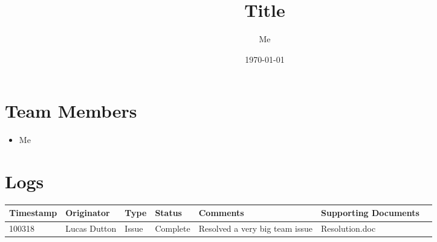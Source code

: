 \documentclass[12pt]{article}
\title{Title}
\author{Me}
\date{\today}
\begin{document}
\maketitle
\section{Team Members}
\begin{itemize}
\item Me
\end{itemize}
\newpage
\section{Logs}
\begin{table}[h]
\begin{tabularx}{\textwidth}{|X|X|X|X|X|X|X|}
\hline
Timestamp & Originator & Type & Status & Comments & Supporting Documents\\
\hline
100318 & Lucas Dutton & Issue & Complete & Resolved a very big team issue & Resolution.doc\\
\hline
\end{tabularx}
\end{table}
\end{document}
